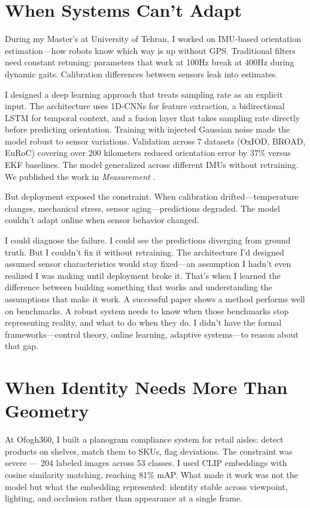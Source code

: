 \documentclass[11pt,a4paper]{article}
\begin{document}
\section*{When Systems Can't Adapt}

During my Master's at University of Tehran, I worked on IMU-based orientation estimation—how robots know which way is up without GPS. Traditional filters need constant retuning: parameters that work at 100Hz break at 400Hz during dynamic gaits. Calibration differences between sensors leak into estimates.

I designed a deep learning approach that treats sampling rate as an explicit input. The architecture uses 1D-CNNs for feature extraction, a bidirectional LSTM for temporal context, and a fusion layer that takes sampling rate directly before predicting orientation. Training with injected Gaussian noise made the model robust to sensor variations. Validation across 7 datasets (OxIOD, BROAD, EuRoC) covering over 200 kilometers reduced orientation error by 37\% versus EKF baselines. The model generalized across different IMUs without retraining. We published the work in \textit{Measurement} \cite{golroudbari2023imu}.

But deployment exposed the constraint. When calibration drifted—temperature changes, mechanical stress, sensor aging—predictions degraded. The model couldn't adapt online when sensor behavior changed.

I could diagnose the failure. I could see the predictions diverging from ground truth. But I couldn't fix it without retraining. The architecture I'd designed assumed sensor characteristics would stay fixed—an assumption I hadn't even realized I was making until deployment broke it. That's when I learned the difference between building something that works and understanding the assumptions that make it work. A successful paper shows a method performs well on benchmarks. A robust system needs to know when those benchmarks stop representing reality, and what to do when they do. I didn't have the formal frameworks—control theory, online learning, adaptive systems—to reason about that gap. 

\section*{When Identity Needs More Than Geometry}

At Ofogh360, I built a planogram compliance system for retail aisles: 
detect products on shelves, match them to SKUs, flag deviations. The 
constraint was severe — 204 labeled images across 53 classes. I used 
CLIP embeddings with cosine similarity matching, reaching 81\% mAP. 
What made it work was not the model but what the embedding represented: 
identity stable across viewpoint, lighting, and occlusion rather than 
appearance at a single frame.
\end{document}
